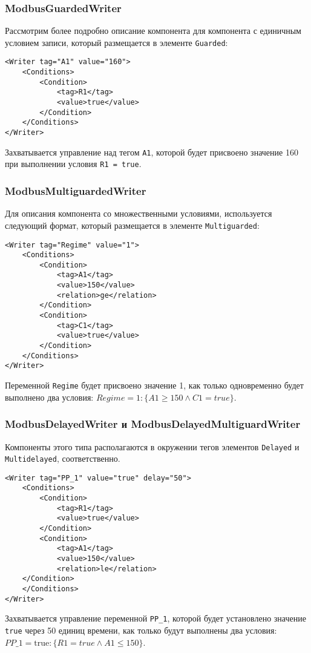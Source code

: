 \subsubsection{ModbusGuardedWriter}
Рассмотрим более подробно описание компонента для компонента с единичным условием записи,
который размещается в элементе \texttt{Guarded}:
\begin{lstlisting}[language=MyXML]
<Writer tag="A1" value="160">
    <Conditions>
        <Condition>
            <tag>R1</tag>
            <value>true</value>
        </Condition>
    </Conditions>
</Writer>
\end{lstlisting}
Захватывается управление над тегом \texttt{A1}, которой будет присвоено значение 160
при выполнении условия \texttt{R1 = true}.


\subsubsection{ModbusMultiguardedWriter}
Для описания компонента со множественными условиями, используется следующий формат,
который размещается в элементе \texttt{Multiguarded}:
\begin{lstlisting}[language=MyXML]
<Writer tag="Regime" value="1">
    <Conditions>
        <Condition>
            <tag>A1</tag>
            <value>150</value>
            <relation>ge</relation>
        </Condition>
        <Condition>
            <tag>C1</tag>
            <value>true</value>
        </Condition>
    </Conditions>
</Writer>
\end{lstlisting}
Переменной \texttt{Regime} будет присвоено значение 1, как только 
одновременно будет выполнено два условия: $Regime = 1: \{A1 \ge 150 \wedge C1 = true\}$.

\subsubsection{ModbusDelayedWriter и ModbusDelayedMultiguardWriter}
Компоненты этого типа располагаются в окружении тегов элементов \texttt{Delayed} и \texttt{Multidelayed}, соответственно.
\begin{lstlisting}[language=MyXML]
<Writer tag="PP_1" value="true" delay="50">
    <Conditions>
        <Condition>
            <tag>R1</tag>
            <value>true</value>
        </Condition>
        <Condition>
            <tag>A1</tag>
            <value>150</value>
            <relation>le</relation>
    </Condition>
    </Conditions>
</Writer>
\end{lstlisting}
Захватывается управление переменной \texttt{PP\_1}, которой будет установлено значение \texttt{true}
через 50 единиц времени, как только будут выполнены два условия:
$PP\_1 = \mbox{true}: \{R1 = true \wedge A1 \le 150\}$.


